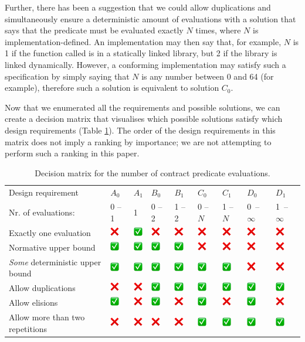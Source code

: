 Further, there has been a suggestion that we could allow duplications and simultaneously ensure a deterministic amount of evaluations with a solution that says that the predicate must be evaluated exactly $N$ times, where $N$ is implementation-defined. An implementation may then say that, for example, $N$ is 1 if the function called is in a statically linked library, but 2 if the library is linked dynamically. However, a conforming implementation may satisfy such a specification by simply saying that $N$ is any number between 0 and 64 (for example), therefore such a solution is equivalent to solution $C_0$.

Now that we enumerated all the requirements and possible solutions, we can create a decision matrix that visualises which possible solutions satisfy which design requirements (Table \ref{table:matrix}). The order of the design requirements in this matrix does not imply a ranking by importance; we are not attempting to perform such a ranking in this paper.

\newcommand{\yes}{\includegraphics[width=4mm]{images/yes.png}}
\newcommand{\no}{\includegraphics[width=4mm]{images/no.png}}
\begin{table}[!htbp]
\begin{tabular}{|p{5.4cm}|p{0.9cm}|p{0.9cm}|p{0.9cm}|p{0.9cm}|p{0.9cm}|p{0.9cm}|p{0.9cm}|p{0.9cm}|}
\hline 
Design requirement & $A_0$ & $A_1$ & $B_0$ & $B_1$ & $C_0$ & $C_1$ & $D_0$ & $D_1$ \\
\phantom{xxxxxxxxxxxi}Nr. of evaluations:& 0 -- 1 & 1 & 0 -- 2& 1 -- 2 & 0 -- $N$ & 1 -- $N$ & \mbox{0 -- $\infty$} & \mbox{1 -- $\infty$} \\
\hline
Exactly one evaluation& \no & \yes & \no & \no & \no & \no & \no & \no \\
\hline
Normative upper bound & \yes & \yes & \yes & \yes & \no & \no & \no & \no \\
\hline
\emph{Some} deterministic upper bound & \yes & \yes & \yes & \yes & \yes & \yes & \no & \no \\
\hline
Allow duplications & \no & \no & \yes & \yes  & \yes & \yes & \yes & \yes \\
\hline
Allow elisions & \yes & \no & \yes & \no & \yes & \no & \yes & \no \\
\hline
Allow more than two repetitions& \no & \no & \no & \no & \yes & \yes & \yes & \yes \\
\hline
\end{tabular}
\vspace{2mm}
\caption{Decision matrix for the number of contract predicate evaluations.}
\label{table:matrix}
\end{table}


